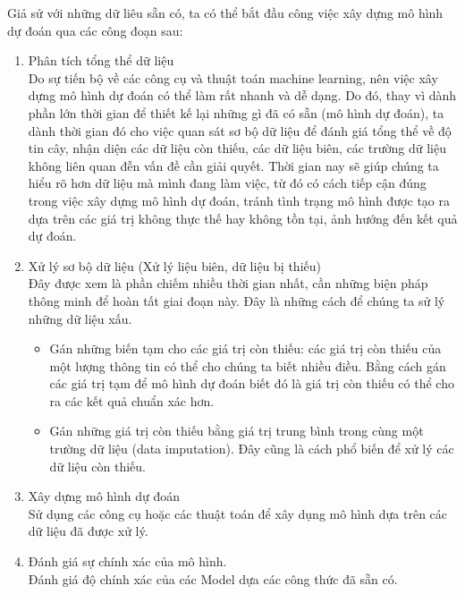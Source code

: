 Giả sử với những dữ liêu sẵn có, ta có thể bắt đầu công việc xây dựng mô hình dự đoán qua các công đoạn sau:
\begin{enumerate}
    \item Phân tích tổng thể dữ liệu \\
    Do sự tiến bộ về các công cụ và thuật toán machine learning, nên việc xây dựng mô hình dự đoán có thể làm rất nhanh và dễ dạng. Do đó, thay vì dành phần lớn thời gian để thiết kế lại những gì đã có sẵn (mô hình dự đoán), ta dành thời gian đó cho việc quan sát sơ bộ dữ liệu để đánh giá tổng thể về độ tin cây, nhận diện các dữ liệu còn thiếu, các dữ liệu biên, các trường dữ liệu không liên quan đễn vấn đề cần giải quyết. Thời gian nay sẽ giúp chúng ta hiểu rõ hơn dữ liệu mà mình đang làm việc, từ đó có cách tiếp cận đúng trong việc xây dựng mô hình dự đoán, tránh tình trạng mô hình được tạo ra dựa trên các giá trị không thực thế hay không tồn tại, ảnh hướng đến kết quả dự đoán.
    \item Xử lý sơ bộ dữ liệu (Xử lý liệu biên, dữ liệu bị thiếu) \\
    Đây được xem là phần chiếm nhiều thời gian nhất, cần những biện pháp thông minh để hoàn tất giai đoạn này. Đây là những cách để chúng ta sử lý những dữ liệu xấu.
    \begin{itemize}
	    \item Gán những biến tạm cho các giá trị còn thiếu: các giá trị còn thiếu của một  lượng thông tin có thể cho chúng ta biết nhiều điều. Bằng cách gán các giá trị tạm để mô hình dự đoán biết đó là giá trị còn thiếu có thể cho ra các kết quả chuẩn xác hơn. \\
	    \item Gán những giá trị còn thiếu bằng giá trị trung bình trong cùng một trường dữ liệu (data imputation). Đây cũng là cách phổ biến để xử lý các dữ liệu còn thiếu. \\
    \end{itemize}
    \item Xây dựng mô hình dự đoán \\
    Sử dụng các công cụ hoặc các thuật toán để xây dụng mô hình dựa trên các dữ liệu đã được xử lý. \\
    \item Đánh giá sự chính xác của mô hình. \\
    Đánh giá độ chính xác của các Model dựa các công thức đã sẵn có. \\
\end{enumerate}

